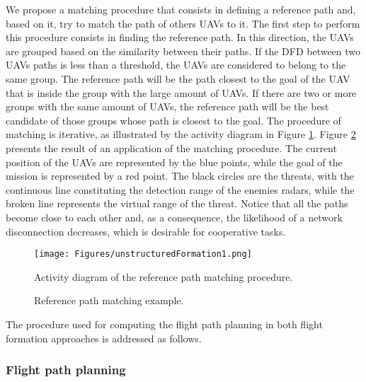We propose a matching procedure that consists in defining a reference path and, based on it, try to match the path of others UAVs to it. The first step to perform this procedure consists in finding the reference path. In this direction, the UAVs are grouped based on the similarity between their paths. If the DFD between two UAVs paths is less than a threshold, the UAVs are considered to belong to the same group. The reference path will be the path closest to the goal of the UAV that is inside the group with the large amount of UAVs. If there are two or more groups with the same amount of UAVs, the reference path will be the best candidate of those groups whose path is closest to the goal. The procedure of matching is iterative, as illustrated by the activity diagram in Figure \ref{fig:unstructuredFormationDiagram}. Figure \ref{fig:refPathMatching} presents the result of an application of the matching procedure. The current position of the UAVs are represented by the blue points, while the goal of the mission is represented by a red point. The black circles are the threats, with the continuous line constituting the detection range of the enemies radars, while the broken line represents the virtual range of the threat. Notice that all the paths become close to each other and, as a consequence, the likelihood of a network disconnection decreases, which is desirable for cooperative tasks.

\begin{figure}[hbt!]
\centering
  \texttt{[image: Figures/unstructuredFormation1.png]}
  \caption{Activity diagram of the reference path matching procedure.} \label{fig:unstructuredFormationDiagram}
\end{figure}

\begin{figure}[hbt!]
      \centering            
      \caption{Reference path matching example.}     
      \label{fig:refPathMatching}
\end{figure}

The procedure used for computing the flight path planning in both flight formation approaches is addressed as follows. 

\subsubsection{Flight path planning}

